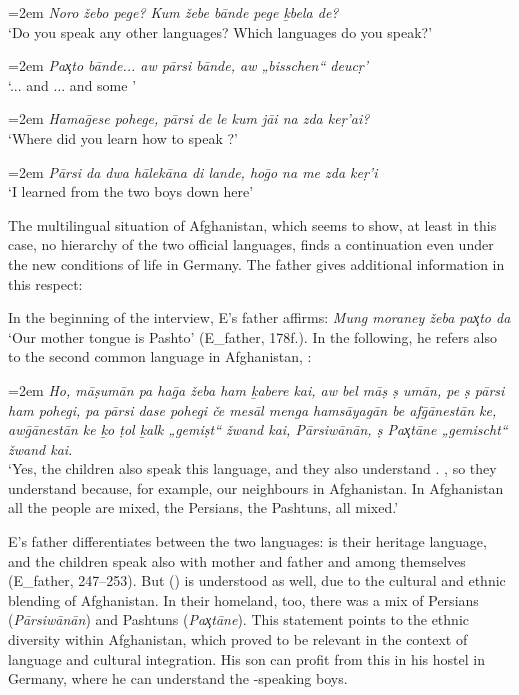 \documentclass[output=paper,colorlinks,citecolor=brown]{langscibook}
\newenvironment{interview}{
  \setlength{\leftskip}{2.5em} %
  \setlength{\rightskip}{2.5em} %
  \setlength{\parindent}{0pt} %
  \vspace{\topsep} %
}{
  \vspace{\topsep} %
}
\newcommand{\speaker}[1]{%
  \noindent\hangindent=2em\makebox[1.5em][l]{#1:}\hspace{0.5em}%
}
\newcommand{\myattrib}[1]{%
    \attrib{#1}
}
\begin{document}
\begin{interview}\label{ch2.5.ex.21}
\speaker{I}\textit{Noro žebo pege? Kum žebe bānde pege ḵbela de?} \\
`Do you speak any other languages? Which languages do you speak?' 

\speaker{E}\textit{Paҳto bānde... aw pārsi bānde, aw „bisschen“ deucṛ'} \\
`... and ... and some ' 

\speaker{I}\textit{Hamaḡese pohege, pārsi de le kum jāi na zda keṛ'ai?} \\
`Where did you learn how to speak ?' 

\speaker{E}\textit{Pārsi da dwa hālekāna di lande, hoḡo na me zda keṛ'i} \\
`I learned  from the two boys down here' 
\myattrib{Int 1\_E, 29--46}
\end{interview}

The multilingual situation of Afghanistan, which seems to show, at least in this case, no hierarchy of the two official languages, finds a continuation even under the new conditions of life in Germany. The father gives additional information in this respect: 

In the beginning of the interview, E's father affirms: \textit{Mung moraney žeba paҳto da} `Our mother tongue is Pashto' (E\_father, 178f.). In the following, he refers also to the second common language in Afghanistan, :

\begin{interview}\label{ch2.5.ex.22}
\speaker{FE}\textit{Ho, māṣumān pa haḡa žeba ham ḵabere kai, aw bel māṣ ṣ umān, pe ṣ pārsi ham pohegi, pa pārsi dase pohegi če mesāl menga hamsāyagān be afḡānestān ke, awḡānestān ke ḵo ṭol ḵalk „gemiṣt“ žwand kai, Pārsiwānān, ṣ Paҳtāne „gemischt“ žwand kai.} \\
`Yes, the children also speak this language, and they also understand . , so they understand  because, for example, our neighbours in Afghanistan. In Afghanistan all the people are mixed, the Persians, the Pashtuns, all mixed.' 
\myattrib{Int 1\_E\_father, 184--191}
\end{interview}

E's father differentiates between the two languages:  is their  heritage language, and the children speak  also with mother and father and among themselves (E\_father, 247--253). But  () is understood as well, due to the cultural and ethnic blending of Afghanistan. In their homeland, too, there was a mix of Persians (\textit{Pārsiwānān}) and Pashtuns (\textit{Paҳtāne}). This statement points to the ethnic diversity within Afghanistan, which proved to be relevant in the context of language and cultural integration. His son can profit from this in his hostel in Germany, where he can understand the -speaking boys.
\end{document}
